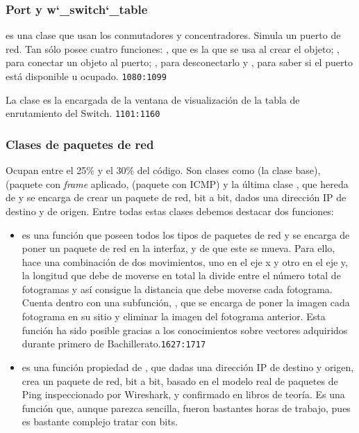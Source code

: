 \documentclass[a4paper, 11pt]{report} %
\begin{document}
\subsubsection{Port y w\char`_switch\char`_table}
 es una clase que usan los conmutadores y concentradores. Simula un puerto de red. Tan sólo posee cuatro funciones: , que es la que se usa al crear el objeto; , para conectar un objeto al puerto; , para desconectarlo y , para saber si el puerto está disponible u ocupado. \texttt{1080:1099}

La clase  es la encargada de la ventana de visualización de la tabla de enrutamiento del Switch. \texttt{1101:1160}

\subsubsection{Clases de paquetes de red}
Ocupan entre el 25\% y el 30\% del código. Son clases como  (la clase base),  (paquete con \textit{frame} aplicado,  (paquete con ICMP) y la última clase , que hereda de  y se encarga de crear un paquete de red, bit a bit, dados una dirección IP de destino y de origen.
Entre todas estas clases debemos destacar dos funciones:
\begin{itemize}
\item {} es una función que poseen todos los tipos de paquetes de red y se encarga de poner un paquete de red en la interfaz, y de que este se mueva. Para ello, hace una combinación de dos movimientos, uno en el eje x y otro en el eje y, la longitud que debe de moverse en total la divide entre el número total de fotogramas y así consigue la distancia que debe moverse cada fotograma. Cuenta dentro con una subfunción, , que se encarga de poner la imagen cada fotograma en su sitio y eliminar la imagen del fotograma anterior. Esta función ha sido posible gracias a los conocimientos sobre vectores adquiridos durante primero de 
Bachillerato.\texttt{1627:1717}
\item {} es una función propiedad de , que dadas una dirección IP de destino y origen, crea un paquete de red, bit a bit, basado en el modelo real de paquetes de Ping inspeccionado por Wireshark, y confirmado en libros de teoría. Es una función que, aunque parezca sencilla, fueron bastantes horas de trabajo, pues es bastante complejo tratar con bits.
\end{itemize}
\inputminted[firstline=1782, lastline=1818, baselinestretch=1, fontsize=\scriptsize, linenos, breaklines]{python}{Codigo/invproy/main.py}
\end{document}

